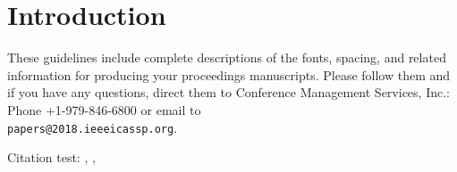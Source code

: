 \section{Introduction}
\label{sec:intro}

These guidelines include complete descriptions of the fonts, spacing, and
related information for producing your proceedings manuscripts. Please follow
them and if you have any questions, direct them to Conference Management
Services, Inc.: Phone +1-979-846-6800 or email
to \\\texttt{papers@2018.ieeeicassp.org}.

Citation test: \cite{Jiang2011}, \cite{DeepChord}, \cite{Chordthesizer}